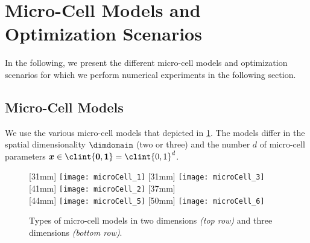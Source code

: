 \section{Micro-Cell Models and Optimization Scenarios}
\label{sec:63models}


\noindent
In the following, we present the different micro-cell models
and optimization scenarios for which we perform numerical
experiments in the following section.



\subsection{Micro-Cell Models}
\label{sec:631models}

We use the various micro-cell models that depicted in \cref{fig:microCell}.
The models differ in the spatial dimensionality $\dimdomain$ (two or three)
and the number $d$ of micro-cell parameters
$\*x \in \clint{\*0, \*1} = \clint{0, 1}^d$.

\begin{figure}
  [31mm]{%
    \texttt{[image: microCell\_1]}%
  }%
  \hfill%
  [31mm]{%
    \texttt{[image: microCell\_3]}%
  }%
  \hfill%
  [41mm]{%
    \texttt{[image: microCell\_2]}%
  }%
  \hfill%
  [37mm]{%
    \hspace*{-45mm}%
  }\\[2mm]%
  [44mm]{%
    \texttt{[image: microCell\_5]}%
  }%
  \qquad%
  [50mm]{%
    \texttt{[image: microCell\_6]}%
  }%
  \caption[Types of micro-cell models]{%
    Types of micro-cell models in two dimensions \emph{(top row)}
    and three dimensions \emph{(bottom row)}.%
  }%
  \label{fig:microCell}%
\end{figure}

